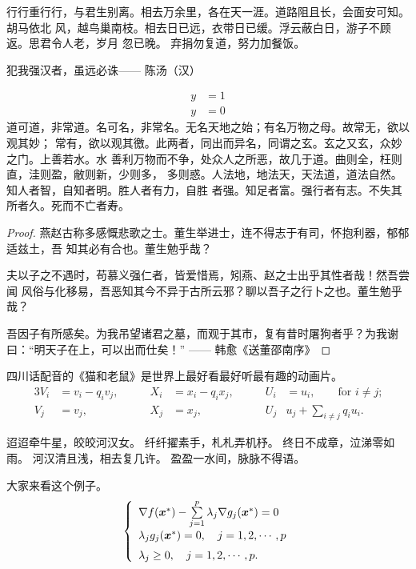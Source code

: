 行行重行行，与君生别离。相去万余里，各在天一涯。道路阻且长，会面安可知。胡马依北
风，越鸟巢南枝。相去日已远，衣带日已缓。浮云蔽白日，游子不顾返。思君令人老，岁月
忽已晚。  弃捐勿复道，努力加餐饭。

\begin{theorem}\label{the:theorem1}
犯我强汉者，虽远必诛\hfill —— 陈汤（汉）
\end{theorem}
\begin{subequations}
\begin{align}
y & = 1 \\
y & = 0
\end{align}
\end{subequations}
道可道，非常道。名可名，非常名。无名天地之始；有名万物之母。故常无，欲以观其妙；
常有，欲以观其徼。此两者，同出而异名，同谓之玄。玄之又玄，众妙之门。上善若水。水
善利万物而不争，处众人之所恶，故几于道。曲则全，枉则直，洼则盈，敝则新，少则多，
多则惑。人法地，地法天，天法道，道法自然。知人者智，自知者明。胜人者有力，自胜
者强。知足者富。强行者有志。不失其所者久。死而不亡者寿。

\begin{proof}
燕赵古称多感慨悲歌之士。董生举进士，连不得志于有司，怀抱利器，郁郁适兹土，吾
知其必有合也。董生勉乎哉？

夫以子之不遇时，苟慕义强仁者，皆爱惜焉，矧燕、赵之士出乎其性者哉！然吾尝闻
风俗与化移易，吾恶知其今不异于古所云邪？聊以吾子之行卜之也。董生勉乎哉？

吾因子有所感矣。为我吊望诸君之墓，而观于其市，复有昔时屠狗者乎？为我谢
曰：“明天子在上，可以出而仕矣！” \hfill —— 韩愈《送董邵南序》
\end{proof}

\begin{corollary}
  四川话配音的《猫和老鼠》是世界上最好看最好听最有趣的动画片。
\begin{alignat}{3}
V_i & =v_i - q_i v_j, & \qquad X_i & = x_i - q_i x_j,
 & \qquad U_i & = u_i,
 \qquad \text{for $i\ne j$;}\label{eq:B}\\
V_j & = v_j, & \qquad X_j & = x_j,
  & \qquad U_j & u_j + \sum_{i\ne j} q_i u_i.
\end{alignat}
\end{corollary}

迢迢牵牛星，皎皎河汉女。
纤纤擢素手，札札弄机杼。
终日不成章，泣涕零如雨。
河汉清且浅，相去复几许。
盈盈一水间，脉脉不得语。

\begin{example}
  大家来看这个例子。
\begin{equation}
\label{ktc}
\left\{\begin{array}{l}
\nabla f({\mbox{\boldmath $x$}}^*)-\sum\limits_{j=1}^p\lambda_j\nabla g_j({\mbox{\boldmath $x$}}^*)=0\\[0.3cm]
\lambda_jg_j({\mbox{\boldmath $x$}}^*)=0,\quad j=1,2,\cdots,p\\[0.2cm]
\lambda_j\ge 0,\quad j=1,2,\cdots,p.
\end{array}\right.
\end{equation}
\end{example}

